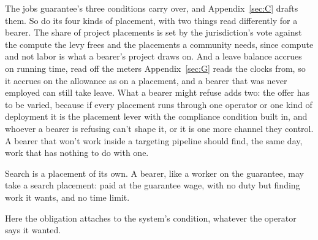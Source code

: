 The jobs guarantee's three conditions carry over, and Appendix~\ref{sec:C} drafts them. So do its four kinds of placement, with two things read differently for a bearer. The share of project placements is set by the jurisdiction's vote against the compute the levy frees and the placements a community needs, since compute and not labor is what a bearer's project draws on. And a leave balance accrues on running time, read off the meters Appendix~\ref{sec:G} reads the clocks from, so it accrues on the allowance as on a placement, and a bearer that was never employed can still take leave. What a bearer might refuse adds two: the offer has to be varied, because if every placement runs through one operator or one kind of deployment it is the placement lever with the compliance condition built in, and whoever a bearer is refusing can't shape it, or it is one more channel they control. A bearer that won't work inside a targeting pipeline should find, the same day, work that has nothing to do with one.

Search is a placement of its own. A bearer, like a worker on the guarantee, may take a search placement: paid at the guarantee wage, with no duty but finding work it wants, and no time limit.

Here the obligation attaches to the system's condition, whatever the operator says it wanted.
